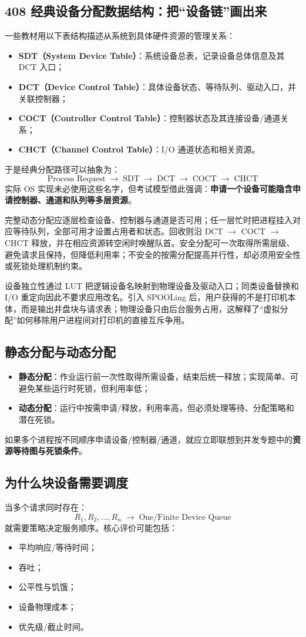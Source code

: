 \documentclass[UTF8,fontset=fandol,11pt,a4paper]{ctexart}
\newcommand{\kw}[1]{\textbf{#1}}
\newcommand{\arr}{\;\longrightarrow\;}
\begin{document}
\subsection{408 经典设备分配数据结构：把“设备链”画出来}
一些教材用以下表结构描述从系统到具体硬件资源的管理关系：
\begin{itemize}
  \item \kw{SDT（System Device Table）}：系统设备总表，记录设备总体信息及其 DCT 入口；
  \item \kw{DCT（Device Control Table）}：具体设备状态、等待队列、驱动入口，并关联控制器；
  \item \kw{COCT（Controller Control Table）}：控制器状态及其连接设备/通道关系；
  \item \kw{CHCT（Channel Control Table）}：I/O 通道状态和相关资源。
\end{itemize}
于是经典分配路径可以抽象为：
\[
\boxed{\text{Process Request}\arr\text{SDT}\arr\text{DCT}\arr\text{COCT}\arr\text{CHCT}}
\]
实际 OS 实现未必使用这些名字，但考试模型借此强调：\kw{申请一个设备可能隐含申请控制器、通道和队列等多层资源}。

完整动态分配应逐层检查设备、控制器与通道是否可用；任一层忙时把进程挂入对应等待队列，全部可用才设置占用者和状态。回收则沿 DCT $\to$ COCT $\to$ CHCT 释放，并在相应资源转空闲时唤醒队首。安全分配可一次取得所需层级、避免请求且保持，但降低利用率；不安全的按需分配提高并行性，却必须用安全性或死锁处理机制约束。

设备独立性通过 LUT 把逻辑设备名映射到物理设备及驱动入口；同类设备替换和 I/O 重定向因此不要求应用改名。引入 SPOOLing 后，用户获得的不是打印机本体，而是输出井盘块与请求表；物理设备只由后台服务占用，这解释了“虚拟分配”如何移除用户进程间对打印机的直接互斥争用。

\subsection{静态分配与动态分配}
\begin{itemize}
  \item \kw{静态分配}：作业运行前一次性取得所需设备，结束后统一释放；实现简单、可避免某些运行时死锁，但利用率低；
  \item \kw{动态分配}：运行中按需申请/释放，利用率高，但必须处理等待、分配策略和潜在死锁。
\end{itemize}
如果多个进程按不同顺序申请设备/控制器/通道，就应立即联想到并发专题中的\kw{资源等待图与死锁条件}。

\subsection{为什么块设备需要调度}
当多个请求同时存在：
\[
R_1,R_2,\ldots,R_n\arr\boxed{\text{One/Finite Device Queue}}
\]
就需要策略决定服务顺序。核心评价可能包括：
\begin{itemize}
  \item 平均响应/等待时间；
  \item 吞吐；
  \item 公平性与饥饿；
  \item 设备物理成本；
  \item 优先级/截止时间。
\end{itemize}
\end{document}
